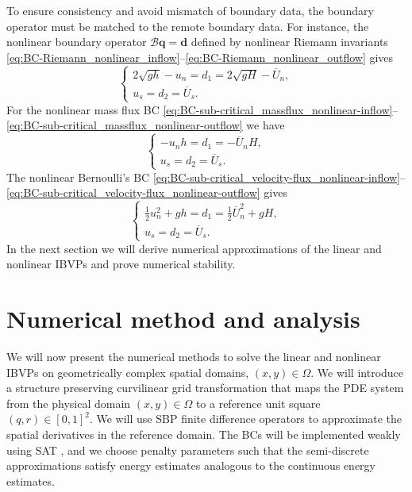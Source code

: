 \documentclass{article}
\numberwithin{equation}{section}
\theoremstyle{definition}
\begin{document}
To ensure consistency and avoid mismatch of boundary data, the boundary operator must be  matched to the remote boundary data. For instance, the nonlinear boundary operator $\mathcal{B}\textbf{q} = \textbf{d}$ defined by nonlinear Riemann invariants \eqref{eq:BC-Riemann_nonlinear_inflow}--\eqref{eq:BC-Riemann_nonlinear_outflow} gives
\begin{equation}\label{eq:BC-Riemann_nonlinear_data}
\begin{cases}
    2\sqrt{gh} - u_n =d_1 = 2\sqrt{gH} - \overline{U}_n, \\
    u_s = d_2  = \overline{U}_s.
\end{cases}
\end{equation}
For  the nonlinear mass flux BC \eqref{eq:BC-sub-critical_massflux_nonlinear-inflow}--\eqref{eq:BC-sub-critical_massflux_nonlinear-outflow} we have
\begin{equation}\label{eq:BC-sub-critical_mass-flux_nonlinear-data}
\begin{cases}
-u_nh = d_1 = - \overline{U}_nH,\\
 u_s = d_2  = \overline{U}_s.
 \end{cases}
\end{equation}
The nonlinear Bernoulli's  BC \eqref{eq:BC-sub-critical_velocity-flux_nonlinear-inflow}--\eqref{eq:BC-sub-critical_velocity-flux_nonlinear-outflow} gives
\begin{equation}\label{eq:BC-sub-critical_velocity-flux_nonlinear-data}
\begin{cases}
\frac{1}{2}u_n^2 + gh =   d_1 = \frac{1}{2}\overline{U}_n^2 + gH,\\
 u_s = d_2  = \overline{U}_s.
 \end{cases}
\end{equation}
%
In the next section we will derive numerical approximations of the linear and nonlinear IBVPs and prove numerical stability.

\section{Numerical method and analysis}\label{sec:numerical-analysis}
% 
We will now present the numerical methods to solve the linear and nonlinear IBVPs on geometrically complex spatial domains, $(x,y)\in \Omega$. We will introduce a structure preserving curvilinear grid transformation that maps the PDE system from the physical domain $(x,y)\in \Omega$ to a reference unit square $(q,r)\in [0, 1]^2$. We will use SBP finite difference operators \cite{BStrand1994,kreiss1974finite,svard2014review,fernandez2014review} to approximate the spatial derivatives in the reference domain. The BCs will be implemented weakly using SAT \cite{carpenter1994time,Mattsson2003}, and we choose penalty parameters such that the semi-discrete approximations satisfy energy estimates analogous to the continuous energy estimates.
\end{document}
